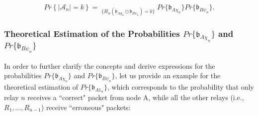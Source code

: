 \documentclass[12pt,draftcls, onecolumn]{IEEEtran}
\begin{document}
\vspace{-1pt}

\begingroup
\begin{equation}
Pr\left\{\left|\mathcal{A}_n\right|=k\right\} = \mathop{\sum_{\chi=0}^{2^n-1}\sum_{\psi=0}^{2^n-1}}_{\{H_w\left(\mathfrak{b}_{A\chi_n}\odot \mathfrak{b}_{B\psi_n}\right) = k\}}Pr\{\mathfrak{b}_{A\chi_n}\}Pr\{\mathfrak{b}_{B\psi_n}\}. \label{P-k-n-2}
\end{equation}
\endgroup

\subsubsection{Theoretical Estimation of the Probabilities $Pr\{\mathfrak{b}_{A\chi_n}\}$ and $Pr\{\mathfrak{b}_{B\psi_n}\}$}
In order to further clarify the concepts and derive expressions for the probabilities $Pr\{\mathfrak{b}_{A\chi_n}\}$ and $Pr\{\mathfrak{b}_{B\psi_n}\}$, let us provide an example for the theoretical estimation of $Pr\{\mathfrak{b}_{A1_n}\}$, which corresponds to the probability that only relay $n$ receives a ``correct" packet from node A, while all the other relays (i.e., $R_1,\ldots, R_{n-1}$) receive ``erroneous" packets:
\end{document}
